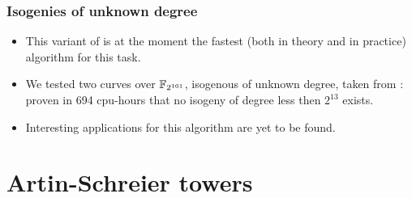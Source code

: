 \documentclass[10pt,usepdftitle=false]{beamer}
\begin{document}
\begin{frame}
  \frametitle{Isogenies of unknown degree}

  \begin{itemize}
  \item This variant of \cite{couveignes96} is at the moment the
    fastest (both in theory and in practice) algorithm for this
    task.
  \item We tested two curves over $\mathbb{F}_{2^{161}}$, isogenous of
    unknown degree, taken from \cite{teske06}: proven in 694
    cpu-hours that no isogeny of degree less then $2^{13}$ exists.
  \item Interesting applications for this algorithm are yet to be
    found.
  \end{itemize}
\end{frame}


\section{Artin-Schreier towers}
\end{document}
